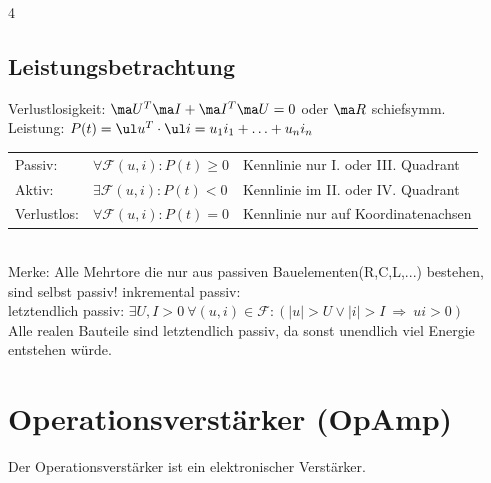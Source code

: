 \documentclass[fs, footer]{latex4ei}
\begin{document}
\begin{multicols*}{4}
    \subsection{Leistungsbetrachtung}
    Verlustlosigkeit: $\ma U^T\ma I + \ma I^T \ma U = 0$ oder $\ma R$ schiefsymm.\\
    Leistung: $P(t)=\ul u^T \cdot \ul i=u_1 i_1 + \dotsc + u_n i_n$ \\
    \begin{tabular*}{\columnwidth}{@{\extracolsep\fill}lll@{}}
        Passiv: & $\forall \mathcal F(u,i): P(t)\ge 0$ & Kennlinie nur I. oder III. Quadrant\\
        Aktiv: & $\exists \mathcal F(u,i): P(t)<0$ & Kennlinie im II. oder IV. Quadrant\\
        Verlustlos: & $\forall \mathcal F(u,i): P(t)=0$ & Kennlinie nur auf Koordinatenachsen\\
    \end{tabular*}\\
    Merke: Alle Mehrtore die nur aus passiven Bauelementen(R,C,L,...) bestehen, sind selbst passiv!
    inkremental passiv:\\
    letztendlich passiv: $\exists U,I>0 \ \forall (u,i) \in \mathcal F : (|u| > U \lor |i| > I \ \Rightarrow \ ui > 0)$\\
    Alle realen Bauteile sind letztendlich passiv, da sonst unendlich viel Energie entstehen würde.\\

    \section{Operationsverstärker (OpAmp)}
    Der Operationsverstärker ist ein elektronischer Verstärker.

\end{multicols*}
\end{document}
